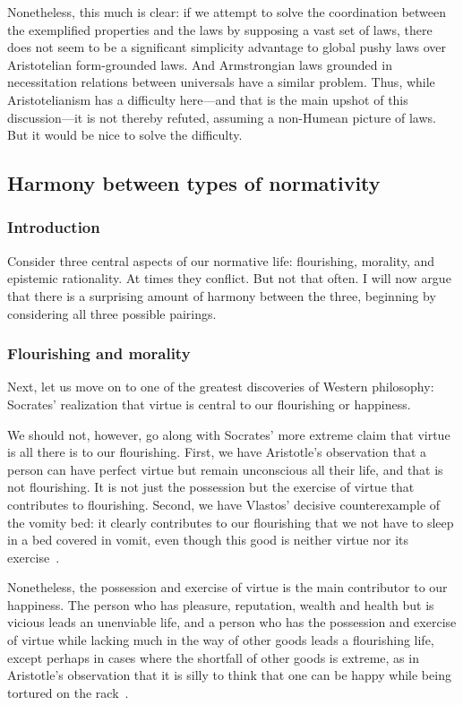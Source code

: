 Nonetheless, this much is clear: if we attempt to solve the coordination between the exemplified properties and 
the laws by supposing a vast set of laws, there does not seem to be a significant simplicity advantage to 
global pushy laws over Aristotelian form-grounded laws. And Armstrongian laws grounded in necessitation relations
between universals have a similar problem. Thus, while Aristotelianism has a difficulty here---and
that is the main upshot of this discussion---it is not thereby refuted, assuming a non-Humean picture of laws.
But it would be nice to solve the difficulty.
 
\subsection{Harmony between types of normativity}
\subsubsection{Introduction}
Consider three central aspects of our normative life: flourishing, morality, and epistemic rationality. At times 
they conflict. But not that often. I will now argue that there is a surprising amount of harmony between the three,
beginning by considering all three possible pairings.

\subsubsection{Flourishing and morality}
Next, let us move on to one of the greatest discoveries of Western philosophy: Socrates' realization that virtue is central to our flourishing or happiness. 

We should not, however, go along with Socrates' more extreme claim that virtue is all there is to our flourishing. 
First, we have Aristotle's observation that a person can have perfect virtue but remain unconscious all their life,
and that is not flourishing. It is not just the possession but the exercise of virtue that contributes to flourishing.
Second, we have Vlastos' decisive counterexample of the vomity bed: it clearly contributes to our flourishing that 
we not have to sleep in a bed covered in vomit, even though this good is neither virtue nor its exercise~\parencite[215]{Vlastos1991}.

Nonetheless, the possession and exercise of virtue is the main contributor to our happiness. The person who
has pleasure, reputation, wealth and health but is vicious leads an unenviable life, and a person who has
the possession and exercise of virtue while lacking much in the way of other goods leads a flourishing life,
except perhaps in cases where the shortfall of other goods is extreme, as in Aristotle's observation that it is
silly to think that one can be happy while being tortured on the rack~\parencite[VII.13]{AristotleNE}.

